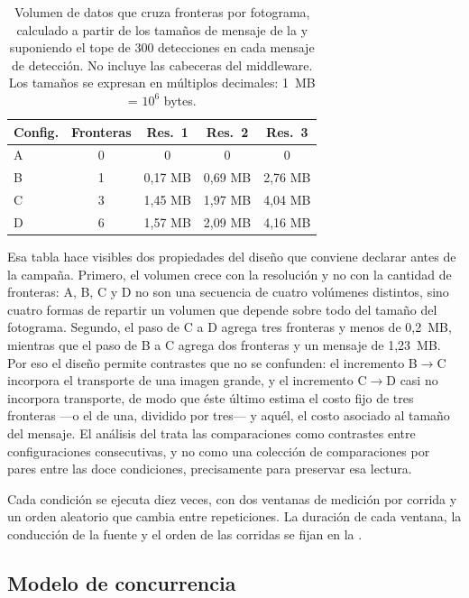 \begin{table}[htbp]
  \centering
  \caption[Volumen de datos por configuración]{Volumen de datos que cruza
  fronteras por fotograma, calculado a partir de los tamaños de mensaje de
  la  y suponiendo el tope de 300 detecciones en cada
  mensaje de detección. No incluye las cabeceras del middleware. Los
  tamaños se expresan en múltiplos decimales: 1~MB = $10^{6}$ bytes.}
  \label{tab:partitioning-payloads}
  \begin{tabular}{@{}lcccc@{}}
    \toprule
    \textbf{Config.} & \textbf{Fronteras} & \textbf{Res.\ 1} &
    \textbf{Res.\ 2} & \textbf{Res.\ 3} \\
    \midrule
    A & 0 & 0 & 0 & 0 \\
    B & 1 & 0,17 MB & 0,69 MB & 2,76 MB \\
    C & 3 & 1,45 MB & 1,97 MB & 4,04 MB \\
    D & 6 & 1,57 MB & 2,09 MB & 4,16 MB \\
    \bottomrule
  \end{tabular}
\end{table}

Esa tabla hace visibles dos propiedades del diseño que conviene declarar
antes de la campaña. Primero, el volumen crece con la resolución y no con la
cantidad de fronteras: A, B, C y D no son una secuencia de cuatro volúmenes
distintos, sino cuatro formas de repartir un volumen que depende sobre todo
del tamaño del fotograma. Segundo, el paso de C a D agrega tres fronteras y
menos de 0,2~MB, mientras que el paso de B a C agrega dos fronteras y un
mensaje de 1,23~MB. Por eso el diseño permite contrastes que no se confunden:
el incremento B$\rightarrow$C incorpora el transporte de una imagen
grande, y el incremento C$\rightarrow$D casi no incorpora transporte, de modo
que éste último estima el costo fijo de tres fronteras ---o el de una,
dividido por tres--- y aquél, el costo asociado al tamaño del mensaje. El
análisis del
 trata las comparaciones como contrastes entre
configuraciones consecutivas, y no como una colección de comparaciones por
pares entre las doce condiciones, precisamente para preservar esa lectura.

Cada condición se ejecuta diez veces, con dos ventanas de medición por
corrida y un orden aleatorio que cambia entre repeticiones. La duración de
cada ventana, la conducción de la fuente y el orden de las corridas se fijan
en la .

\subsection{Modelo de concurrencia}
\label{sec:concurrency}

